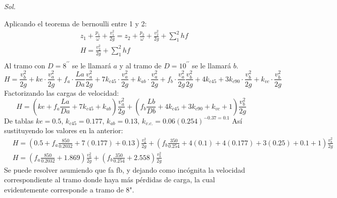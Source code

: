 \textit{ Sol. }

Aplicando el teorema de bernoulli entre 1 y 2: 
\begin{align*}
    &z_1 + \frac{p_1}{\omega} + \frac{v_1^2}{2g} = z_2 + \frac{p_2}{\omega} + \frac{v_2^2}{2g} + \sum_1^2 hf\\
    &H = \frac{v_2^2}{2g} + \sum_1^2 hf\\
\end{align*}
Al tramo con $D=8^{\prime\prime}$ se le llamará $a$ y al tramo de $D=10^{\prime\prime}$ se le llamará $b$.
\begin{equation*}
    H = \frac{v_b^2}{2g} + ke\cdot \frac{v_a^2}{2g} + f_a\cdot \frac{La}{Da}\frac{v_a^2}{2g} + 7k_{c45}\cdot \frac{v_a^2}{2g} + k_{ab}\cdot \frac{v_a^2}{2g} + f_b\cdot \frac{v_a^2}{2g}\frac{v_b^2}{2g} + 4k_{c45} + 3k_{c 90}\cdot \frac{v_b^2}{2g} + k_{vc}\cdot\frac{v_b^2}{2g}
\end{equation*}
Factorizando las cargas de velocidad:
\begin{equation*}
    H =\left(ke + f_a\frac{La}{Da} + 7k_{c 45} + k_{ab}\right)\frac{v_a^2}{2g} +\left(f_b\frac{Lb}{Db} +4k_{c 45} + 3k_{c 90} + k_{vc} + 1 \right)\frac{v_b^2}{2g}
\end{equation*}
De tablas $ke=0.5$, $k_{c 45}=0.177$, $k_{ab}=0.13$,  $k_{v.c.}=0.06(0.254)^{-0.37=0.1}$ Así sustituyendo los valores en la anterior:
\begin{align*}
    &H =\left(0.5 + f_a\frac{850}{0.2032} + 7(0.177) +0.13 \right) \frac{v_a^2}{2g} +\left(f_b\frac{350}{0.254} + 4(0.1) + 4(0.177) + 3(0.25) + 0.1 + 1 \right) \frac{v_b^2}{2g}\\
    &H =\left(f_a\frac{850}{0.2032} + 1.869\right) \frac{v_a^2}{2g} +\left(f_b\frac{350}{0.254} + 2.558\right) \frac{v_b^2}{2g}
\end{align*}
Se puede resolver asumiendo que fa fb, y dejando como incógnita la velocidad correspondiente al tramo donde haya más pérdidas de carga, la cual evidentemente corresponde a tramo de 8".

